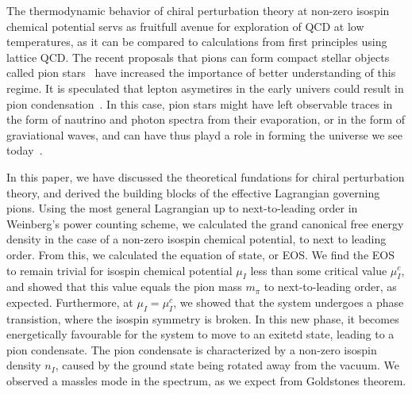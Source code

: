 
The thermodynamic behavior of chiral perturbation theory at non-zero isospin chemical potential servs as fruitfull avenue for exploration of QCD at low temperatures, as it can be compared to calculations from first principles using lattice QCD.
The recent proposals that pions can form compact stellar objects called pion stars~\cite{new_clas_of_compact_stars,andersen:bose_einstein} have increased the importance of better understanding of this regime.
It is speculated that lepton asymetires in the early univers could result in pion condensation~\cite{new_clas_of_compact_stars,abduki:Pion_condensation_in_a_dense_neutrino_gas,Wygas:Cosmic_QCD_Epoch_at_Nonvanishing_Lepton_Asymmetry,Schwarz_2009:Lepton_asymmetry_and_the_cosmic_QCD_transition}.
In this case, pion stars might have left observable traces in the form of nautrino and photon spectra from their evaporation, or in the form of graviational waves, and can have thus playd a role in forming the universe we see today~\cite{new_clas_of_compact_stars}.

In this paper, we have discussed the theoretical fundations for chiral perturbation theory, and derived the building blocks of the effective Lagrangian governing pions.
Using the most general Lagrangian up to next-to-leading order in Weinberg's power counting scheme, we calculated the grand canonical free energy density in the case of a non-zero isospin chemical potential, to next to leading order.
From this, we calculated the equation of state, or EOS.
We find the EOS to remain trivial for isospin chemical potential $\mu_I$ less than some critical value $\mu_I^c$, and showed that this value equals the pion mass $m_\pi$ to next-to-leading order, as expected.
Furthermore, at $\mu_I = \mu_I^c$, we showed that the system undergoes a phase transistion, where the isospin symmetry is broken.
In this new phase, it becomes energetically favourable for the system to move to an exitetd state, leading to a pion condensate.
The pion condensate is characterized by a non-zero isospin density $n_I$, caused by the ground state being rotated away from the vacuum.
We observed a massles mode in the spectrum, as we expect from Goldstones theorem.


